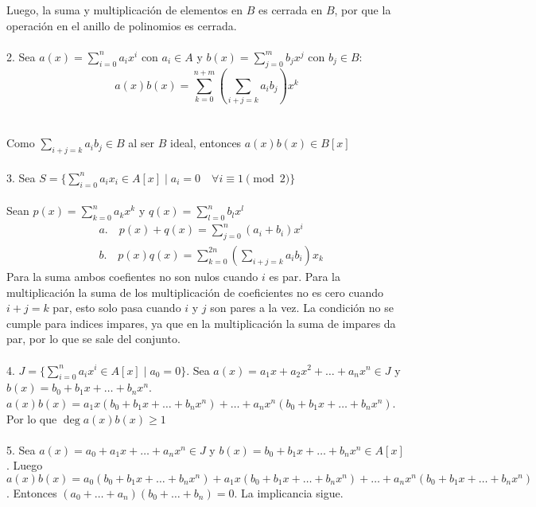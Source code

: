\documentclass{article}
\begin{document}
Luego, la suma y multiplicación de elementos en $B$ es cerrada en $B$, por que la operación en el anillo de polinomios es cerrada.
\\
\\
2. Sea $a(x)=\sum_{i=0}^{n}a_{i}x^{i}$ con $a_{i} \in A$ y $b(x)=\sum_{j=0}^{m}b_{j}x^{j}$ con $b_{j} \in B$:
\begin{equation*}
    a(x)b(x)=\sum_{k=0}^{n+m} \left(\sum_{i+j=k} a_{i}b_{j} \right) x^{k}
\end{equation*}
\\
\\
Como $\sum_{i+j=k}a_{i}b_{j} \in B$ al ser $B$ ideal, entonces $a(x)b(x) \in B[x]$
\\
\\
3. Sea $S=\{ \sum_{i=0}^{n}a_{i}x_{i} \in A[x] \mid a_{i}=0 \quad \forall i \equiv 1 \pmod{2} \}$
\\
\\
Sean $p(x)=\sum_{k=0}^{n}a_{k}x^{k}$ y $q(x)=\sum_{l=0}^{n}b_{l}x^{l}$
\begin{equation*}
\begin{aligned}
    &a. \quad p(x)+q(x)=\sum_{j=0}^{n} (a_{i}+b_{i})x^{i} \\
    &b. \quad p(x)q(x)=\sum_{k=0}^{2n} \left(\sum_{i+j=k}a_{i}b_{i} \right)x_{k}
\end{aligned}
\end{equation*}
Para la suma ambos coefientes no son nulos cuando $i$ es par. Para la multiplicación la suma de los multiplicación de coeficientes no es cero cuando $i+j=k$ par, esto solo pasa cuando $i$ y $j$ son pares a la vez. La condición no se cumple para indices impares, ya que en la multiplicación la suma de impares da par, por lo que se sale del conjunto.
\\
\\
4. $J = \{ \sum_{i=0}^{n}a_{i}x^{i} \in A[x] \mid a_{0}=0\}$. Sea $a(x)=a_{1}x+a_{2}x^{2}+\dots+a_{n}x^{n} \in J$ y $b(x)=b_{0}+b_{1}x+\dots+b_{n}x^{n}$. $a(x)b(x) = a_{1}x(b_{0}+b_{1}x+\dots+b_{n}x^{n})+\dots+a_{n}x^{n}(b_{0}+b_{1}x+\dots+b_{n}x^{n})$. Por lo que $\deg a(x)b(x) \geq 1$
\\
\\
5. Sea $a(x)=a_{0}+a_{1}x+\dots+a_{n}x^{n} \in J$ y $b(x)=b_{0}+b_{1}x+\dots+b_{n}x^{n} \in A[x]$. Luego $a(x)b(x)=a_{0}(b_{0}+b_{1}x+\dots+b_{n}x^{n})+a_{1}x(b_{0}+b_{1}x+\dots+b_{n}x^{n})+\dots+a_{n}x^{n}(b_{0}+b_{1}x+\dots+b_{n}x^{n})$. Entonces $(a_{0}+\dots+a_{n})(b_{0}+\dots+b_{n})=0$. La implicancia sigue.
\\
\\
\end{document}
